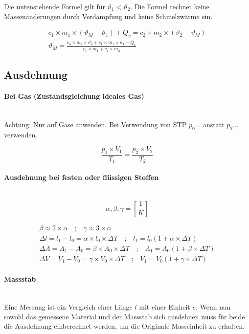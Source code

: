 \documentclass[a4paper,10pt]{article}
\newcommand{\lbparagraph}[1]{\paragraph{#1}\mbox{}\\}
\newcommand{\eqsp}[1]{\quad\textbf{;}\quad}
\begin{document}
Die untenstehende Formel gilt für ${\vartheta}_1 < {\vartheta}_2$. Die Formel rechnet keine Massenänderungen durch Verdampfung und keine Schmelzwärme ein.

\begin{gather}
    c_1 \times m_1 \times ({\vartheta}_M - {\vartheta}_1) + Q_v = c_2 \times m_2 \times ({\vartheta}_2 - {\vartheta}_M) \\
    {\vartheta}_M = \frac{c_2 \times m_2 \times {\vartheta}_2 + c_1 \times m_1 \times {\vartheta}_1 - Q_v}{c_1 \times m_1 + c_2 \times m_2}
\end{gather}

\subsection{Ausdehnung}

\lbparagraph{Bei Gas (Zustandsgleichung ideales Gas)}

Achtung: Nur auf Gase anwenden. Bei Verwendung von STP $p_0...$ anstatt $p_2...$ verwenden.

\begin{equation}
    \frac{p_1 \times V_1}{T_1} = \frac{p_2 \times V_2}{T_2}
\end{equation}

\lbparagraph{Ausdehnung bei festen oder flüssigen Stoffen}

\begin{equation*}
    \alpha, \beta, \gamma = [\frac{1}{K}]
\end{equation*}

\begin{gather}
    \beta \approx 2 \times \alpha
    \eqsp{}
    \gamma \approx 3 \times \alpha \\
    {\Delta}l = l_1 - l_0 = \alpha \times l_0 \times {\Delta}T
    \eqsp{}
    l_1 = l_0(1 + \alpha \times {\Delta}T) \\
    {\Delta}A = A_1 - A_0 = \beta \times A_0 \times {\Delta}T
    \eqsp{}
    A_1 = A_0(1 + \beta \times {\Delta}T) \\
    {\Delta}V = V_1 - V_0 = \gamma \times V_0 \times {\Delta}T
    \eqsp{}
    V_1 = V_0(1 + \gamma \times {\Delta}T)
\end{gather}

\lbparagraph{Massstab}

Eine Messung ist ein Vergleich einer Länge $l$ mit einer Einheit $e$. Wenn nun sowohl das gemessene Material und der Massstab sich ausdehnen muss für beide die Ausdehnung einberechnet werden, um die Originale Masseinheit zu erhalten.
\end{document}
